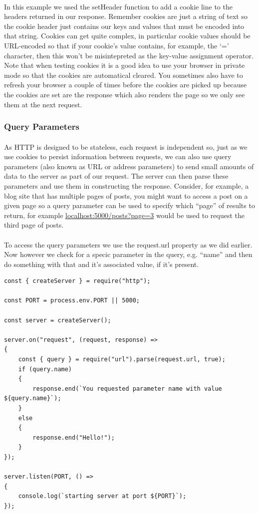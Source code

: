 \documentclass[10pt, a4paper, twosize]{article}
\begin{document}
\paragraph{} In this example we used the setHeader function to add a cookie line to the headers returned in our response. Remember cookies are just a string of text so the cookie header just contains our keys and values that must be encoded into that string. Cookies can get quite complex, in particular cookie values should be URL-encoded so that if your cookie's value contains, for example, the `=' character, then this won't be misintepreted as the key-value assignment operator. Note that when testing cookies it is a good idea to use your browser in private mode so that the cookies are automatical cleared. You sometimes also have to refresh your browser a couple of times before the cookies are picked up because the cookies are set are the response which also renders the page so we only see them at the next request.

\subsubsection{Query Parameters}
\paragraph{} As HTTP is designed to be stateless, each request is independent so, just as we use cookies to persist information between requests, we can also use query parameters (also known as URL or address parameters) to send small amounts of data to the server as part of our request. The server can then parse these parameters and use them in constructing the response. Consider, for example, a blog site that has multiple pages of posts, you might want to access a post on a given page so a query parameter can be used to specify which ``page'' of results to return, for example \url{localhost:5000/posts?page=3} would be used to request the third page of posts.

\paragraph{} To access the query parameters we use the request.url property as we did earlier. Now however we check for a specic parameter in the query, e.g. ``name'' and then do something with that and it's associated value, if it's present.

\begin{lstlisting}
const { createServer } = require("http");

const PORT = process.env.PORT || 5000;

const server = createServer();

server.on("request", (request, response) => 
{
    const { query } = require("url").parse(request.url, true);
    if (query.name) 
    {
        response.end(`You requested parameter name with value ${query.name}`);
    } 
    else 
    {
        response.end("Hello!");
    } 
});

server.listen(PORT, () => 
{
    console.log(`starting server at port ${PORT}`);
});
\end{lstlisting}
\end{document}
